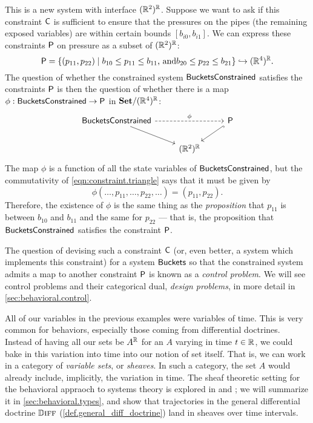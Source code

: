 \documentclass[DynamicalBook]{subfiles}
\begin{document}
This is a new system with interface $(\mathbb{R}^2)^{\mathbb{R}}$. Suppose we want to ask if
this constraint $\mathsf{C}$ is sufficient to ensure that the pressures on the
pipes (the remaining exposed variables) are within certain bounds $[b_{i0}, b_{i1}]$. We can
express these constraints $\mathsf{P}$ on pressure as a subset of
$(\mathbb{R}^{2})^{\mathbb{R}}$:
\[
\mathsf{P} = \{(p_{11}, p_{22}) \mid b_{10} \leq p_{11} \leq b_{11}\text{, and}
b_{20} \leq p_{22} \leq b_{21}\} \hookrightarrow (\mathbb{R}^4)^{\mathbb{R}}.
\]
The question of whether the constrained system $\mathsf{BucketsConstrained}$
satisfies the constraints $\mathsf{P}$ is then the question of whether there is a
map $\phi : \mathsf{BucketsConstrained} \to \mathsf{P}$ in
$\textbf{Set}/(\mathbb{R}^4)^{\mathbb{R}}$:
\begin{equation}\label{eqn:constraint.triangle}
\begin{tikzcd}
	{\Sys{BucketsConstrained}} && {\Sys{P}} \\
	& {(\rr^2)^{\rr}}
	\arrow[dashed, from=1-1, to=1-3, "\phi"]
	\arrow[from=1-1, to=2-2]
	\arrow[hook, from=1-3, to=2-2]
\end{tikzcd}
\end{equation}
The map $\phi$ is a function of all the state variables of
$\mathsf{BucketsConstrained}$, but the commutativity of
\cref{eqn:constraint.triangle} says that it must be given by
$$\phi(\ldots, p_{11}, \ldots, p_{22}, \ldots) = (p_{11}, p_{22}).$$
Therefore, the existence of $\phi$ is the same thing as the \emph{proposition}
that $p_{11}$ is between $b_{10}$ and $b_{11}$ and the same for $p_{22}$ ---
that is, the proposition that $\mathsf{BucketsConstrained}$ satisfies the
constraint $\mathsf{P}$.

The question of devising such a constraint $\mathsf{C}$ (or, even better, a system
which implements this constraint) for a system
$\mathsf{Buckets}$ so that the constrained system admits a map to another
constraint $\mathsf{P}$ is known as a \emph{control problem}. We will see control
problems and their categorical dual, \emph{design problems}, in more detail in \cref{sec:behavioral.control}.

All of our variables in the previous examples were variables of time. This is
very common for behaviors, especially those coming from differential doctrines.
Instead of having all our sets be $A^{\mathbb{R}}$ for an $A$ varying in time $t \in
\mathbb{R}$, we could bake in this variation into time into our notion of set itself.
That is, we can work in a category of \emph{variable sets}, or \emph{sheaves}.
In such a category, the set $A$ would already include, implicitly, the variation
in time. The sheaf theoretic setting for the behavioral appraoch to systems
theory is explored in \cite{schultz2016dynamical} and
\cite{schultz2019temporal}; we will summarize it in \cref{sec:behavioral.types},
and show that trajectories in the general differential doctrine $\mathbb{D}\textsc{iff}$
(\cref{def.general_diff_doctrine}) land in sheaves over time intervals.
\end{document}
